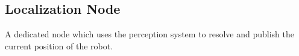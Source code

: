 \subsection{Localization Node} A dedicated node which uses the perception system to resolve and publish the current position of the robot.
